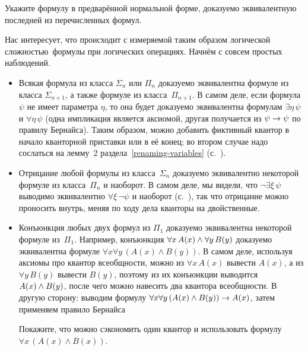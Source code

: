 \begin{problem}
Укажите формулу в предварённой нормальной форме, доказуемо
эквивалентную последней из перечисленных формул.
\end{problem}

Нас интересует, что происходит с измеряемой таким образом 
логической сложностью\ формулы при логических операциях.
Начнём с совсем простых наблюдений.
\begin{itemize}
        \item
Всякая формула из класса $\Sigma_n$ или $\Pi_n$ доказуемо
эквивалентна формуле из класса $\Sigma_{n+1}$, а также формуле
из класса~$\Pi_{n+1}$. В самом деле, если формула $\psi$ не имеет
параметра $\eta$, то она будет доказуемо эквивалентна формулам
$\exists\eta\,\psi$ и $\forall\eta\,\psi$ (одна импликация
является аксиомой, другая получается из $\psi\hm\to\psi$ по
правилу Бернайса). Таким образом, можно добавить фиктивный
квантор в начало кванторной приставки или в её конец; во втором
случае надо сослаться на лемму~2
раздела~\ref{renaming-variables} (с.~\pageref{changing-parts}).

        \item
Отрицание любой формулы из класса~$\Sigma_n$ доказуемо
эквивалентно некоторой формуле из класса~$\Pi_n$ и наоборот. В
самом деле, мы видели, что $\lnot\exists\xi\,\psi$ выводимо
эквивалентно $\forall\xi\,\lnot\psi$ и наоборот
(с.~\pageref{quantifier-duality}), так что отрицание можно
проносить внутрь, меняя по ходу дела кванторы на двойственные.

        \item
Конъюнкция любых двух формул из $\Pi_1$ доказуемо
эквивалентна некоторой формуле из~$\Pi_1$. Например,
конъюнкция $\forall x\,A(x)\hm\land \forall y\,B(y)$
доказуемо эквивалентна формуле ${\forall x \forall y\,
(A(x)\land B(y))}$. В самом деле, используя аксиомы про квантор
всеобщности, можно из $\forall x\, A(x)$ вывести $A(x)$, а из
$\forall y\, B(y)$ вывести $B(y)$, поэтому из их конъюнкции
выводится $A(x)\hm\land B(y)$, после чего можно навесить два
квантора всеобщности. В другую сторону:
выводим формулу ${\forall x\forall y\, (A(x)\land B(y))}\hm\to
A(x)$, затем применяем правило Бернайса 

\begin{problem}
Покажите, что можно сэкономить один квантор и
использовать формулу ${\forall x\, (A(x)\land B(x))}$.
\end{problem}


\end{itemize}
